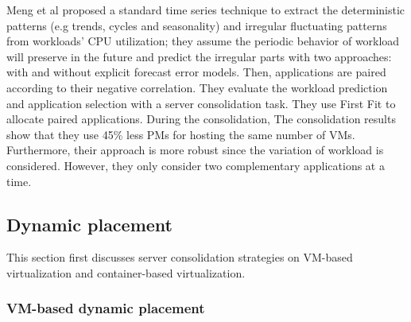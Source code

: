 Meng et al \cite{Meng:2010gh} proposed a standard time series technique to extract the deterministic patterns (e.g trends, cycles and seasonality) and irregular fluctuating patterns from workloads' CPU utilization; they assume the periodic behavior of workload will preserve in the future and predict the irregular parts with two approaches: with and without explicit forecast error models. Then, applications are paired according to their negative correlation. They evaluate the workload prediction and application selection with a server consolidation task. They use First Fit to allocate paired applications. During the consolidation, The consolidation results show that they use 45\% less PMs for hosting the same number of VMs. Furthermore, their approach is more robust since the variation of workload is considered. However, they only consider two complementary applications at a time. 





\subsection{Dynamic placement}
This section first discusses server consolidation strategies on VM-based virtualization and container-based virtualization.


\subsubsection{VM-based dynamic placement}
\label{sec:dynamic}

